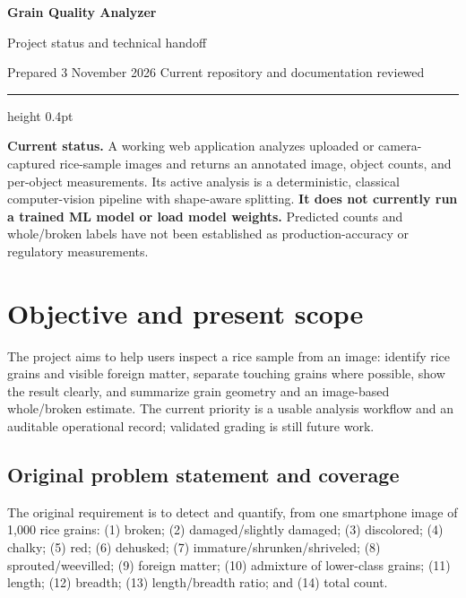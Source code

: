 \documentclass[10pt,a4paper]{article}
\begin{document}
\begin{center}
{\LARGE\bfseries Grain Quality Analyzer\par}
\vspace{3pt}
{\large Project status and technical handoff\par}
\vspace{6pt}
{\small Prepared 3 November 2026 \quad\textbullet\quad Current repository and documentation reviewed\par}
\end{center}
\vspace{4pt}
\hrule height 0.4pt
\vspace{8pt}

\noindent
\textbf{Current status.} A working web application analyzes uploaded or camera-captured rice-sample images and returns an annotated image, object counts, and per-object measurements. Its active analysis is a deterministic, classical computer-vision pipeline with shape-aware splitting. \textbf{It does not currently run a trained ML model or load model weights.} Predicted counts and whole/broken labels have not been established as production-accuracy or regulatory measurements.

\section{Objective and present scope}
The project aims to help users inspect a rice sample from an image: identify rice grains and visible foreign matter, separate touching grains where possible, show the result clearly, and summarize grain geometry and an image-based whole/broken estimate. The current priority is a usable analysis workflow and an auditable operational record; validated grading is still future work.

\subsection{Original problem statement and coverage}
The original requirement is to detect and quantify, from one smartphone image of 1,000 rice grains: (1) broken; (2) damaged/slightly damaged; (3) discolored; (4) chalky; (5) red; (6) dehusked; (7) immature/shrunken/shriveled; (8) sprouted/weevilled; (9) foreign matter; (10) admixture of lower-class grains; (11) length; (12) breadth; (13) length/breadth ratio; and (14) total count.
\end{document}

